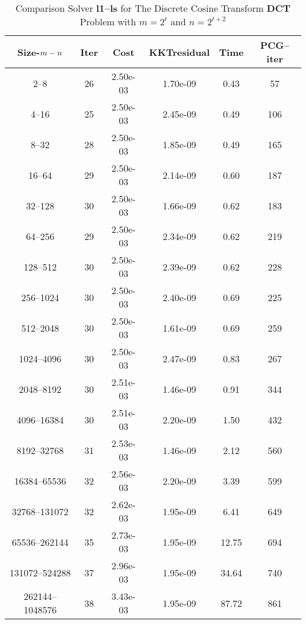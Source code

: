 \documentclass[letterpaper,12pt,oneside,final]{book}
\begin{document}
\begin{table}
\caption{Comparison Solver  {\bf l1--ls}  for  The Discrete Cosine Transform {\bf DCT} Problem with  $m=2^{t}$ and $n=2^{t+2}$} 
\begin{center}
\begin{tabular}{|*{6}{c}|} \hline
Size-$m\--n$ & \multicolumn{1}{c}{Iter} & \multicolumn{1}{c}{Cost}& \multicolumn{1}{c}{KKTresidual} & \multicolumn{1}{c}{Time} & \multicolumn{1}{c|}{PCG--iter} \\ 
\hline
2--8             &26     &2.50e-03  &1.70e-09  &0.43   &57    \\
4--16            &25     &2.50e-03  &2.45e-09  &0.49   &106   \\
8--32            &28     &2.50e-03  &1.85e-09  &0.49   &165   \\
16--64           &29     &2.50e-03  &2.14e-09  &0.60   &187   \\
32--128          &30     &2.50e-03  &1.66e-09  &0.62   &183   \\
64--256          &29     &2.50e-03  &2.34e-09  &0.62   &219   \\
128--512         &30     &2.50e-03  &2.39e-09  &0.62   &228   \\
256--1024        &30     &2.50e-03  &2.40e-09  &0.69   &225   \\
512--2048        &30     &2.50e-03  &1.61e-09  &0.69   &259   \\
1024--4096       &30     &2.50e-03  &2.47e-09  &0.83   &267   \\
2048--8192       &30     &2.51e-03  &1.46e-09  &0.91   &344   \\
4096--16384      &30     &2.51e-03  &2.20e-09  &1.50   &432   \\
8192--32768      &31     &2.53e-03  &1.46e-09  &2.12   &560   \\
16384--65536     &32     &2.56e-03  &2.20e-09  &3.39   &599   \\
32768--131072    &32     &2.62e-03  &1.95e-09  &6.41   &649   \\
65536--262144    &35     &2.73e-03  &1.95e-09  &12.75  &694   \\
131072--524288   &37     &2.96e-03  &1.95e-09  &34.64  &740   \\
262144--1048576  &38     &3.43e-03  &1.95e-09  &87.72  &861   \\

\hline
\end{tabular}
\end{center}
\end{table}
\end{document}
